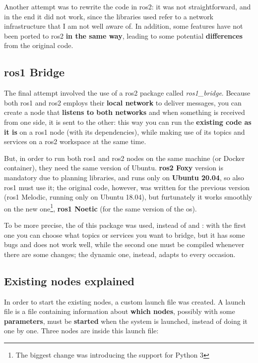 Another attempt was to rewrite the code in \acrshort{ros}2: it was not straightforward, and in the end it did not work, since the libraries used refer to a network infrastructure that I am not well aware of. In addition, some features have not been ported to \acrshort{ros}2 \textbf{in the same way}, leading to some potential \textbf{differences} from the original code.

\subsection{\acrshort{ros}1 Bridge}

The final attempt involved the use of a \acrshort{ros}2 package called \textit{ros1\_bridge}. Because both \acrshort{ros}1 and \acrshort{ros}2 employs their \textbf{local network} to deliver messages, you can create a node that \textbf{listens to both networks} and when something is received from one side, it is sent to the other: this way you can run the \textbf{existing code as it is} on a \acrshort{ros}1 node (with its dependencies), while making use of its topics and services on a \acrshort{ros}2 workspace at the same time.

But, in order to run both \acrshort{ros}1 and \acrshort{ros}2 nodes on the same machine (or Docker container), they need the same version of Ubuntu. \textbf{\acrshort{ros}2 Foxy} version is mandatory due to planning libraries, and runs only on \textbf{Ubuntu 20.04}, so also \acrshort{ros}1 must use it; the original code, however, was written for the previous version (\acrshort{ros}1 Melodic, running only on Ubuntu 18.04), but furtunately it works smoothly on the new one\footnote{The biggest change was introducing the support for Python 3}, \textbf{\acrshort{ros}1 Noetic} (for the same version of the \acrshort{os}).

To be more precise, the  of this package was used, instead of  and : with the first one you can choose what topics or services you want to bridge, but it has some bugs and does not work well, while the second one must be compiled whenever there are some changes; the dynamic one, instead, adapts to every occasion.

\subsection{Existing nodes explained}
\label{subsec:nodes}

In order to start the existing nodes, a custom launch file was created. A launch file is a file containing information about \textbf{which nodes}, possibly with some \textbf{parameters}, must be \textbf{started} when the system is launched, instead of doing it one by one. Three nodes are inside this launch file:

